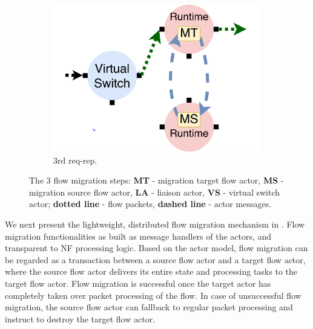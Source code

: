 \begin{figure}[!t]
  \begin{subfigure}[t]{0.33\linewidth}
 \centering
   \includegraphics[width=\columnwidth]{figure/nfactor-mig3.pdf}
   \caption{3rd req-rep.}\label{fig:mig3} \end{subfigure}\hfill
 \caption{The 3 flow migration steps: \textbf{MT} - migration target flow actor, \textbf{MS} - migration source flow actor, \textbf{LA} - liaison actor, \textbf{VS} - virtual switch actor; \textbf{dotted line} - flow packets, \textbf{dashed line} - actor messages.}
\label{fig:mig}
\end{figure}

We next present the lightweight, distributed flow migration mechanism in \nfactor. Flow migration functionalities as built as message handlers of the actors, and transparent to NF processing logic. Based on the actor model, flow migration can be regarded as a transaction between a source flow actor and a target flow actor, where the source flow actor delivers its entire state and processing tasks to the target flow actor. Flow migration is successful once the target actor has completely taken over packet processing of the flow. %
 In case of unsuccessful flow migration, the source flow actor can fallback to regular packet processing and instruct to destroy the target flow actor.

